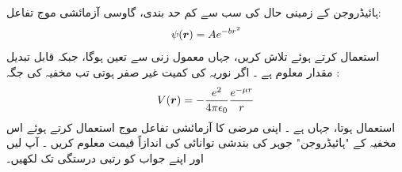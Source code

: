 ہائیڈروجن کے  زمینی حال کی سب سے کم حد بندی،  گاوسی آزمائشی  موج تفاعل:
\begin{align*}
\psi({{\boldsymbol{r}}})=Ae^{-br^{2}} 
\end{align*}
 استعمال کرتے ہوئے تلاش کریں،  جہاں   معمول زنی سے    تعین ہوگا، جبکہ   قابل تبدیل مقدار معلوم ہے ۔    
اگر نوریہ کی کمیت غیر صفر  ہوتی تب مخفیہ کی جگہ : 
\begin{align}
V({{\boldsymbol{r}}})=-\frac{e^{2}}{4\pi\epsilon_{0}}\frac{e^{-\mu r}}{r} 
\end{align}
 استعمال ہوتا، جہاں  ہے ۔ اپنی مرضی کا  آزمائشی  تفاعل موج استعمال کرتے ہوئے اس مخفیہ کے "ہائیڈروجن"   جوہر کی بندشی توانائی کی اندازاً  قیمت معلوم کریں ۔ آپ  لیں اور اپنے جواب کو  رتبی درستگی تک لکھیں۔
 
